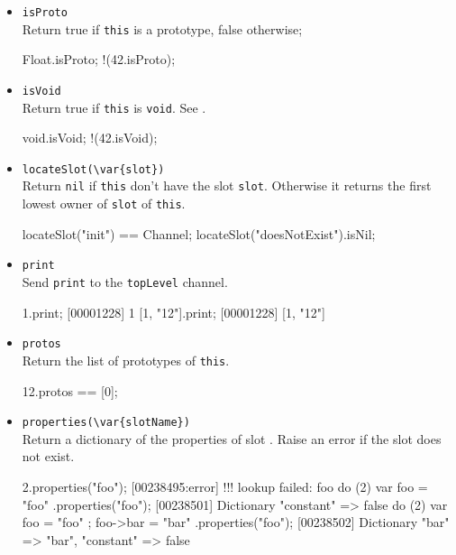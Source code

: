 \begin{itemize}
\item \lstinline|isProto|\\
  Return true if \lstinline|this| is a prototype, false otherwise;
\begin{urbiassert}
Float.isProto;
!(42.isProto);
\end{urbiassert}

\item \lstinline|isVoid|\\
  Return true if \lstinline|this| is \lstinline|void|.  See
  .
\begin{urbiassert}
void.isVoid;
!(42.isVoid);
\end{urbiassert}

\item \lstinline|locateSlot(\var{slot})|\\
  Return \lstinline|nil| if \lstinline|this| don't have the slot
  \lstinline|slot|. Otherwise it returns the first lowest owner of
  \lstinline|slot| of \lstinline|this|.
\begin{urbiassert}
locateSlot("init") == Channel;
locateSlot("doesNotExist").isNil;
\end{urbiassert}

\item \lstinline|print|\\
  Send \lstinline|print| to the \lstinline|topLevel| channel.
\begin{urbiscript}
1.print;
[00001228] 1
[1, "12"].print;
[00001228] [1, "12"]
\end{urbiscript}

\item \lstinline|protos|\\
  Return the list of prototypes of \lstinline|this|.
\begin{urbiassert}
12.protos == [0];
\end{urbiassert}

\item \lstinline|properties(\var{slotName})|\\
  Return a dictionary of the properties of slot .  Raise
  an error if the slot does not exist.
\begin{urbiscript}
2.properties("foo");
[00238495:error] !!! lookup failed: foo
do (2) { var foo = "foo" }.properties("foo");
[00238501] Dictionary {"constant" => false}
do (2) { var foo = "foo" ; foo->bar = "bar" }.properties("foo");
[00238502] Dictionary {"bar" => "bar", "constant" => false}
\end{urbiscript}


\end{itemize}
